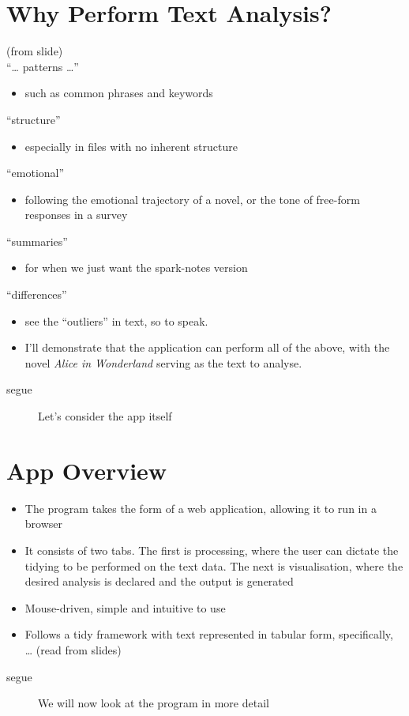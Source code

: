 \documentclass[11pt,a4paper]{article}
\begin{document}
\section{Why Perform Text Analysis?}
\label{sec:why-perform-text}
(from slide)\\
\enquote{\dots{} patterns \dots{}}
\begin{itemize}
\item such as common phrases and keywords
\end{itemize}
\enquote{structure}
\begin{itemize}
\item especially in files with no inherent structure
\end{itemize}
\enquote{emotional}
\begin{itemize}
\item following the emotional trajectory of a novel, or the tone of
  free-form responses in a survey
\end{itemize}
\enquote{summaries}
\begin{itemize}
\item for when we just want the spark-notes version
\end{itemize}
\enquote{differences}
\begin{itemize}
\item see the ``outliers'' in text, so to speak.
\item I'll demonstrate that the application can perform all of the above, with the novel \textit{Alice in Wonderland} serving as the text to analyse.
\end{itemize}
\begin{description}
\item[segue] Let's consider the app itself
\end{description}

\section{App Overview}
\label{sec:app-overview}
\begin{itemize}
\item The program takes the form of a web application, allowing it to
  run in a browser
\item It consists of two tabs. The first is processing, where the user
  can dictate the tidying to be performed on the text data. The next
  is visualisation, where the desired analysis is declared and the
  output is generated
\item Mouse-driven, simple and intuitive to use
\item Follows a tidy framework with text represented in tabular form,
  specifically, \dots{} (read from slides)
\end{itemize}
\begin{description}
\item[segue] We will now look at the program in more detail
\end{description}
\end{document}
